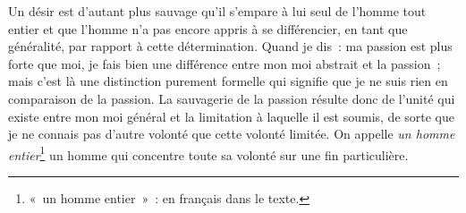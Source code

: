 {Un désir est d'autant plus sauvage qu'il s'empare à lui seul de
l'homme tout entier et que l'homme n'a pas encore appris à se
différencier, en tant que généralité, par rapport à cette
détermination. Quand je dis~: ma passion est plus forte que moi, je
fais bien une différence entre mon moi abstrait et la passion~; mais
c'est là une distinction purement formelle qui signifie que je ne
suis rien en comparaison de la passion. La sauvagerie de la passion
résulte donc de l'unité qui existe entre mon moi général et la
limitation à laquelle il est soumis, de sorte que je ne connais pas
d'autre volonté que cette volonté limitée. On appelle \textit{un homme
entier}\footnote{«~un homme entier~»~: en français dans le texte.} un
homme qui concentre toute sa volonté sur une fin particulière.

}
